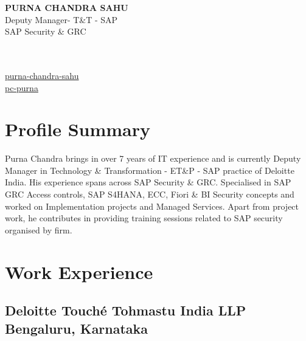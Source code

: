 \documentclass[10pt]{article}
\begin{document}
\begin{center}
	\begin{minipage}{0.5\textwidth}
		{\bfseries \Large
			PURNA CHANDRA SAHU %
		} \\ 
		Deputy Manager- T\&T - SAP \\ %
		SAP Security \& GRC

	\end{minipage} \hfill
	\begin{minipage}{0.3\textwidth}
		\footnotesize \raggedright
			\\
			 \\
			 \href {linkedin.com/in/purna-chandra-sahu}{purna-chandra-sahu} \\
			  \href {github.com/pc-purna}{pc-purna} \\
	\end{minipage}
\end{center}

\section{Profile Summary}
\begin{minipage}{1.0\textwidth}
	
	\small 
	{
		Purna Chandra brings in over 7 years of IT experience and is currently Deputy Manager 
	in Technology \& Transformation - ET\&P - SAP practice of Deloitte India. His experience spans across SAP Security \& GRC. 
	Specialised in SAP GRC Access controls, SAP S4HANA, ECC, Fiori \& BI Security concepts and 
	worked on Implementation projects and Managed Services. Apart from project work, he contributes in providing 
	training sessions related to SAP security organised by firm.
	}
\end{minipage}



\section{Work Experience}
\subsection{Deloitte Touché Tohmastu India LLP \hfill \normalfont Bengaluru, Karnataka}
\end{document}
